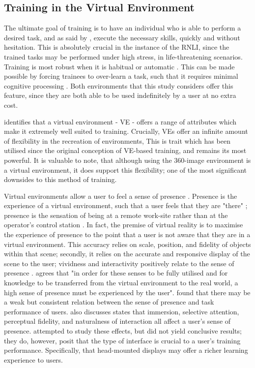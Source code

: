 \documentclass[ %
                    author={Elis Jones},
                supervisor={Dr. Kirsten Cater},
                    degree={BSc},
                     title={The Effect of Presentation Medium on Spatial Cognition},
                  subtitle={in the Virtual Environment},
                      year={2018} ]{dissertation}
\begin{document}
\subsection{Training in the Virtual Environment}
The ultimate goal of training is to have an individual who is able to perform a desired task, and as said by \cite{hussein}, execute the necessary skills, quickly and without hesitation. This is absolutely crucial in the instance of the RNLI, since the trained tasks may be performed under high stress, in life-threatening scenarios. Training is most robust when it is habitual or automatic \citep{hussein}. This can be made possible by forcing trainees to over-learn a task, such that it requires minimal cognitive processing  \citep{kirlik}. Both environments that this study considers offer this feature, since they are both able to be used indefinitely by a user at no extra cost. 

\citet{osberg} identifies that a virtual environment - VE - offers a range of attributes which make it extremely well suited to training. Crucially, VEs offer an infinite amount of flexibility in the recreation of environments, This is trait which has been utilised since the original conception of VE-based training, and remains its most powerful. It is valuable to note, that although using the 360-image environment is a virtual environment, it does support this flexibility; one of the most significant downsides to this method of training. 

Virtual environments allow a user to feel a sense of presence \citep{osberg}. Presence is the experience of a virtual environment, such that a user feels that they are "there" \citep{steuer}; presence is the sensation of being at a remote work-site rather than at the operator's control station \citep{Witmer1998}. In fact, the premise of virtual reality is to maximise the experience of presence to the point that a user is not aware that they are in a virtual environment. This accuracy relies on scale, position, and fidelity  of objects within that scene; secondly, it relies on the accurate and responsive display of the scene to the user; vividness and interactivity positively relate to the sense of presence \citep{steuer}. \cite{Gupta2008} agrees that "in order for these senses to be fully utilised and for knowledge to be transferred from the virtual environment to the real world, a high sense of presence must be experienced by the user". \cite{Witmer1998} found that there may be a weak but consistent relation between the sense of presence and task performance of users. \cite{Witmer1998} also discusses states that immersion, selective attention, perceptual fidelity, and naturalness of interaction all affect a user's sense of presence. \cite{Romano2001} attempted to study these effects, but did not yield conclusive results; they do, however, posit that the type of interface is crucial to a user's training performance. Specifically, that head-mounted displays may offer a richer learning experience to users.
\end{document}
